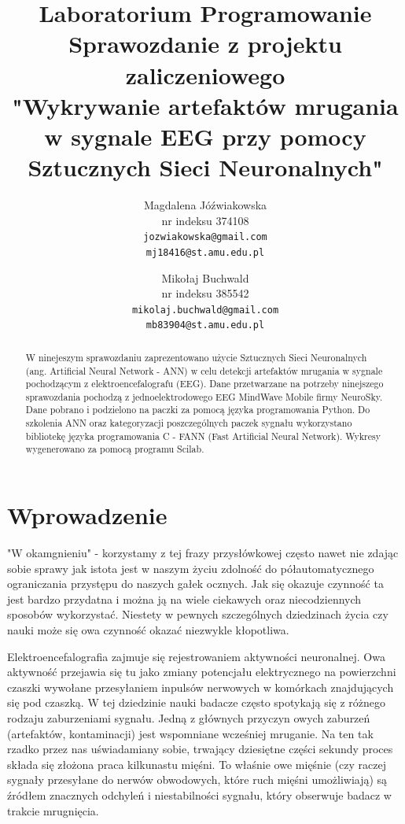 \documentclass{article}
\author{
Magdalena Jóźwiakowska\\nr indeksu 374108\\\texttt{jozwiakowska@gmail.com}\\\texttt{mj18416@st.amu.edu.pl}
\and
Mikołaj Buchwald\\nr indeksu 385542\\\texttt{mikolaj.buchwald@gmail.com}\\\texttt{mb83904@st.amu.edu.pl}
}
\title{Laboratorium Programowanie\\Sprawozdanie z projektu zaliczeniowego\\ 
"Wykrywanie artefaktów mrugania w sygnale EEG przy pomocy Sztucznych Sieci Neuronalnych"}
\begin{document}
\maketitle

\begin{abstract}
    W ninejeszym sprawozdaniu zaprezentowano użycie Sztucznych Sieci Neuronalnych (ang. Artificial Neural Network - ANN) w celu detekcji artefaktów mrugania w sygnale pochodzącym z elektroencefalografu (EEG). Dane przetwarzane na potrzeby ninejszego sprawozdania pochodzą z jednoelektrodowego EEG MindWave Mobile firmy NeuroSky. Dane pobrano i podzielono na paczki za pomocą języka programowania Python. Do szkolenia ANN oraz kategoryzacji poszczególnych paczek sygnału wykorzystano bibliotekę języka programowania C - FANN (Fast Artificial Neural Network). Wykresy wygenerowano za pomocą programu Scilab.
\end{abstract}

    \newpage
    \section{Wprowadzenie}
    "W okamgnieniu" - korzystamy z tej frazy przysłówkowej często nawet nie zdając sobie sprawy jak istota jest w naszym życiu zdolność do półautomatycznego ograniczania przystępu do naszych gałek ocznych. Jak się okazuje czynność ta jest bardzo przydatna i można ją na wiele ciekawych oraz niecodziennych sposobów wykorzystać. Niestety w pewnych szczególnych dziedzinach życia czy nauki może się owa czynność okazać niezwykle kłopotliwa.

    Elektroencefalografia zajmuje się rejestrowaniem aktywności neuronalnej. Owa aktywność przejawia się tu jako zmiany potencjału elektrycznego na powierzchni czaszki wywołane przesyłaniem inpulsów nerwowych w komórkach znajdujących się pod czaszką. W tej dziedzinie nauki badacze często spotykają się z różnego rodzaju zaburzeniami sygnału. Jedną z głównych przyczyn owych zaburzeń (artefaktów, kontaminacji) jest wspomniane wcześniej mruganie. Na ten tak rzadko przez nas uświadamiany sobie, trwający dziesiętne części sekundy proces składa się złożona praca kilkunastu mięśni. To właśnie owe mięśnie (czy raczej sygnały przesyłane do nerwów obwodowych, które ruch mięśni umożliwiają) są źródłem znacznych odchyleń i niestabilności sygnału, który obserwuje badacz w trakcie mrugnięcia.
\end{document}
